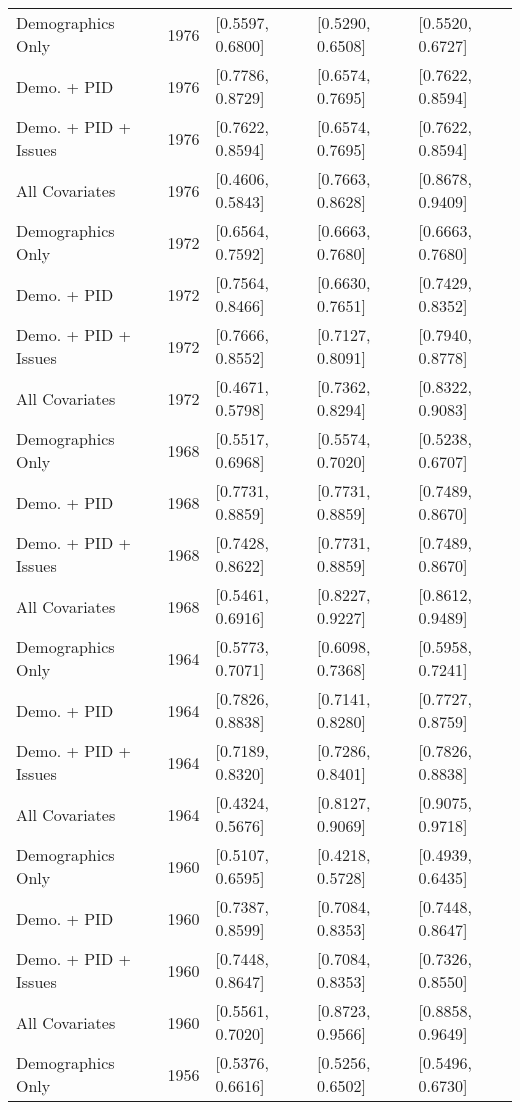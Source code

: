 \begin{longtable}{lrlll}
  Demographics Only & 1976 & [0.5597, 0.6800] & [0.5290, 0.6508] & [0.5520, 0.6727] \\ 
  Demo. + PID & 1976 & [0.7786, 0.8729] & [0.6574, 0.7695] & [0.7622, 0.8594] \\ 
  Demo. + PID + Issues & 1976 & [0.7622, 0.8594] & [0.6574, 0.7695] & [0.7622, 0.8594] \\ 
  All Covariates & 1976 & [0.4606, 0.5843] & [0.7663, 0.8628] & [0.8678, 0.9409] \\ 
  Demographics Only & 1972 & [0.6564, 0.7592] & [0.6663, 0.7680] & [0.6663, 0.7680] \\ 
  Demo. + PID & 1972 & [0.7564, 0.8466] & [0.6630, 0.7651] & [0.7429, 0.8352] \\ 
  Demo. + PID + Issues & 1972 & [0.7666, 0.8552] & [0.7127, 0.8091] & [0.7940, 0.8778] \\ 
  All Covariates & 1972 & [0.4671, 0.5798] & [0.7362, 0.8294] & [0.8322, 0.9083] \\ 
  Demographics Only & 1968 & [0.5517, 0.6968] & [0.5574, 0.7020] & [0.5238, 0.6707] \\ 
  Demo. + PID & 1968 & [0.7731, 0.8859] & [0.7731, 0.8859] & [0.7489, 0.8670] \\ 
  Demo. + PID + Issues & 1968 & [0.7428, 0.8622] & [0.7731, 0.8859] & [0.7489, 0.8670] \\ 
  All Covariates & 1968 & [0.5461, 0.6916] & [0.8227, 0.9227] & [0.8612, 0.9489] \\ 
  Demographics Only & 1964 & [0.5773, 0.7071] & [0.6098, 0.7368] & [0.5958, 0.7241] \\ 
  Demo. + PID & 1964 & [0.7826, 0.8838] & [0.7141, 0.8280] & [0.7727, 0.8759] \\ 
  Demo. + PID + Issues & 1964 & [0.7189, 0.8320] & [0.7286, 0.8401] & [0.7826, 0.8838] \\ 
  All Covariates & 1964 & [0.4324, 0.5676] & [0.8127, 0.9069] & [0.9075, 0.9718] \\ 
  Demographics Only & 1960 & [0.5107, 0.6595] & [0.4218, 0.5728] & [0.4939, 0.6435] \\ 
  Demo. + PID & 1960 & [0.7387, 0.8599] & [0.7084, 0.8353] & [0.7448, 0.8647] \\ 
  Demo. + PID + Issues & 1960 & [0.7448, 0.8647] & [0.7084, 0.8353] & [0.7326, 0.8550] \\ 
  All Covariates & 1960 & [0.5561, 0.7020] & [0.8723, 0.9566] & [0.8858, 0.9649] \\ 
  Demographics Only & 1956 & [0.5376, 0.6616] & [0.5256, 0.6502] & [0.5496, 0.6730] \\ 

\end{longtable}
